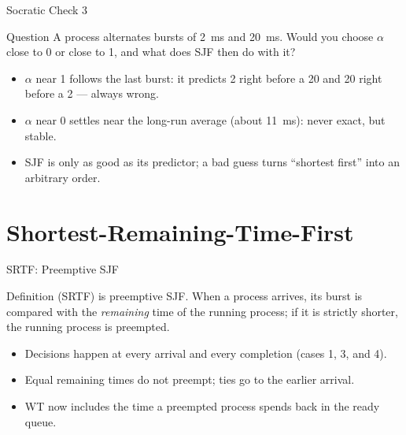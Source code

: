 \documentclass[aspectratio=169]{beamer}
\begin{document}
\begin{frame}{Socratic Check 3}
  \begin{block}{Question}
    A process alternates bursts of 2~ms and 20~ms. Would you choose
    $\alpha$ close to 0 or close to 1, and what does SJF then do with it?
  \end{block}
  \vspace{0.25cm}
  \begin{itemize}
    \item $\alpha$ near 1 follows the last burst: it predicts 2 right before a
      20 and 20 right before a 2 --- always wrong.
    \item $\alpha$ near 0 settles near the long-run average (about 11~ms):
      never exact, but stable.
    \item SJF is only as good as its predictor; a bad guess turns ``shortest
      first'' into an arbitrary order.
  \end{itemize}
\end{frame}


\section{Shortest-Remaining-Time-First}

\begin{frame}{SRTF: Preemptive SJF}
  \begin{block}{Definition}
     (SRTF) is preemptive SJF. When a
    process arrives, its burst is compared with the \emph{remaining} time of
    the running process; if it is strictly shorter, the running process is
    preempted.
  \end{block}
  \begin{itemize}
    \item Decisions happen at every arrival and every completion (cases 1,
      3, and 4).
    \item Equal remaining times do not preempt; ties go to the earlier
      arrival.
    \item WT now includes the time a preempted process spends back in the
      ready queue.
  \end{itemize}
\end{frame}
\end{document}

